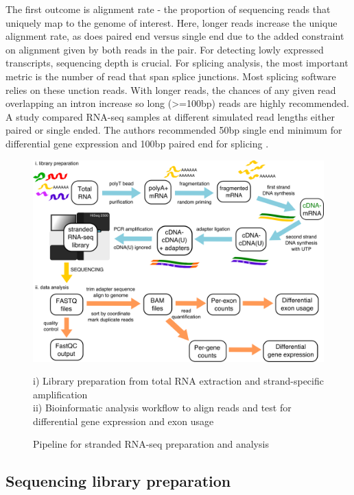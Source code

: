The first outcome is alignment rate - the proportion of sequencing reads that uniquely map to the genome of interest. 
Here, longer reads increase the unique alignment rate, as does paired end versus single end due to the added constraint on alignment given by both reads in the pair. 
For detecting lowly expressed transcripts, sequencing depth is crucial. 
For splicing analysis, the most important metric is the number of read that span splice junctions. Most splicing software relies on these unction reads.
With longer reads, the chances of any given read overlapping an intron increase so long (>=100bp) reads are highly recommended.
A study compared RNA-seq samples at different simulated read lengths either paired or single ended.
The authors recommended 50bp single end minimum for differential gene expression and 100bp paired end for splicing \citep{Chhangawala2015}. 


\begin{figure}[h!]
	\begin{center}
		\includegraphics[width=14cm]{Figures/02_methods/RNAseq_pipeline_schematic.png}
	\end{center}
	\caption{Pipeline for stranded RNA-seq preparation and analysis}
	i) Library preparation from total RNA extraction and strand-specific amplification\\
	ii) Bioinformatic analysis workflow to align reads and test for differential gene expression and exon usage
\end{figure}

\subsection{Sequencing library preparation}

